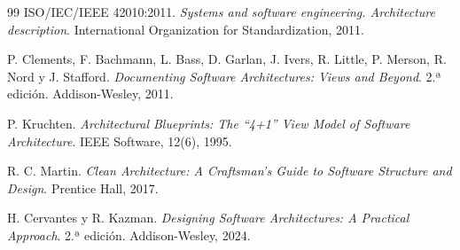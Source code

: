 \documentclass[11pt,letterpaper]{article}
\begin{document}
\begin{thebibliography}{99}
ISO/IEC/IEEE 42010:2011. \textit{Systems and software engineering. Architecture description}.
International Organization for Standardization, 2011.

P. Clements, F. Bachmann, L. Bass, D. Garlan, J. Ivers, R. Little, P. Merson, R. Nord y J. Stafford.
\textit{Documenting Software Architectures: Views and Beyond}. 2.ª edición. Addison-Wesley, 2011.

P. Kruchten. \textit{Architectural Blueprints: The \enquote{4+1} View Model of Software
Architecture}. IEEE Software, 12(6), 1995.

R. C. Martin. \textit{Clean Architecture: A Craftsman's Guide to Software Structure and Design}.
Prentice Hall, 2017.

H. Cervantes y R. Kazman. \textit{Designing Software Architectures: A Practical Approach}. 2.ª
edición. Addison-Wesley, 2024.

\end{thebibliography}
\endgroup
\end{document}
